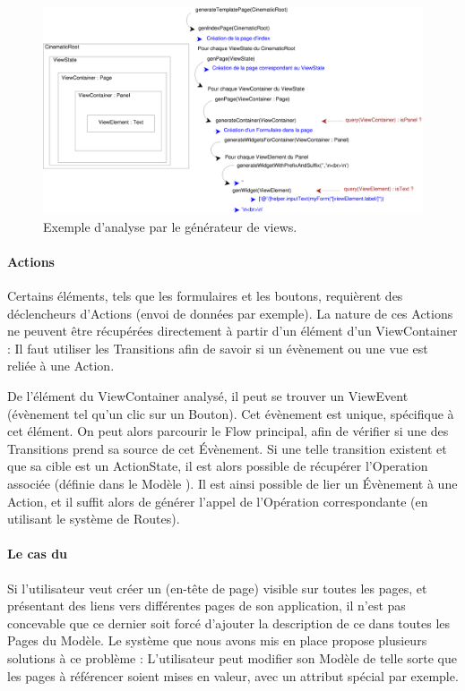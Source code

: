 \begin{figure}[H]
  \centering
  \includegraphics[scale=.35]{img/viewexample.eps}
  \caption{Exemple d'analyse par le générateur de views.}
  \label{fig:ex_view}
\end{figure}

\paragraph{Actions}
Certains éléments, tels que les formulaires et les boutons, requièrent des déclencheurs d'Actions (envoi de données par exemple). La nature de ces Actions ne peuvent être récupérées directement à partir d'un élément d'un ViewContainer : Il faut utiliser les Transitions afin de savoir si un évènement ou une vue est reliée à une Action.

De l'élément du ViewContainer analysé, il peut se trouver un ViewEvent (évènement tel qu'un clic sur un Bouton). Cet évènement est unique, spécifique à cet élément. On peut alors parcourir le Flow principal, afin de vérifier si une des Transitions prend sa source de cet Évènement. Si une telle transition existent et que sa cible est un ActionState, il est alors possible de récupérer l'Operation associée (définie dans le Modèle \kwsoa). Il est ainsi possible de lier un Évènement à une Action, et il suffit alors de générer l'appel de l'Opération correspondante (en utilisant le système de Routes).

\paragraph{Le cas du }
Si l'utilisateur veut créer un  (en-tête de page) visible sur toutes les pages, et présentant des liens vers différentes pages de son application, il n'est pas concevable que ce dernier soit forcé d'ajouter la description de ce  dans toutes les Pages du Modèle. Le système que nous avons mis en place propose plusieurs solutions à ce problème : L'utilisateur peut modifier son Modèle de telle sorte que les pages à référencer soient mises en valeur, avec un attribut spécial par exemple.

